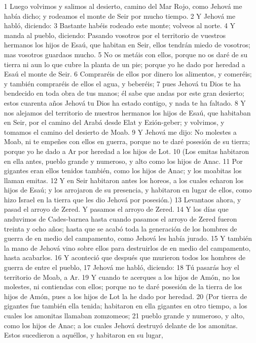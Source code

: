1 Luego volvimos y salimos al desierto, camino del Mar Rojo, como Jehová me había dicho; y rodeamos el monte de Seir por mucho tiempo.
2 Y Jehová me habló, diciendo:
3 Bastante habéis rodeado este monte; volveos al norte.
4 Y manda al pueblo, diciendo: Pasando vosotros por el territorio de vuestros hermanos los hijos de Esaú, que habitan en Seir, ellos tendrán miedo de vosotros; mas vosotros guardaos mucho.
5 No os metáis con ellos, porque no os daré de su tierra ni aun lo que cubre la planta de un pie; porque yo he dado por heredad a Esaú el monte de Seir.
6 Compraréis de ellos por dinero los alimentos, y comeréis; y también compraréis de ellos el agua, y beberéis;
7 pues Jehová tu Dios te ha bendecido en toda obra de tus manos; él sabe que andas por este gran desierto; estos cuarenta años Jehová tu Dios ha estado contigo, y nada te ha faltado.
8 Y nos alejamos del territorio de nuestros hermanos los hijos de Esaú, que habitaban en Seir, por el camino del Arabá desde Elat y Ezión-geber; y volvimos, y tomamos el camino del desierto de Moab.
9 Y Jehová me dijo: No molestes a Moab, ni te empeñes con ellos en guerra, porque no te daré posesión de su tierra; porque yo he dado a Ar por heredad a los hijos de Lot.
10 (Los emitas habitaron en ella antes, pueblo grande y numeroso, y alto como los hijos de Anac.
11 Por gigantes eran ellos tenidos también, como los hijos de Anac; y los moabitas los llaman emitas.
12 Y en Seir habitaron antes los horeos, a los cuales echaron los hijos de Esaú; y los arrojaron de su presencia, y habitaron en lugar de ellos, como hizo Israel en la tierra que les dio Jehová por posesión.)
13 Levantaos ahora, y pasad el arroyo de Zered. Y pasamos el arroyo de Zered.
14 Y los días que anduvimos de Cades-barnea hasta cuando pasamos el arroyo de Zered fueron treinta y ocho años; hasta que se acabó toda la generación de los hombres de guerra de en medio del campamento, como Jehová les había jurado. 
15 Y también la mano de Jehová vino sobre ellos para destruirlos de en medio del campamento, hasta acabarlos.
16 Y aconteció que después que murieron todos los hombres de guerra de entre el pueblo,
17 Jehová me habló, diciendo:
18 Tú pasarás hoy el territorio de Moab, a Ar.
19 Y cuando te acerques a los hijos de Amón, no los molestes, ni contiendas con ellos; porque no te daré posesión de la tierra de los hijos de Amón, pues a los hijos de Lot la he dado por heredad.
20 (Por tierra de gigantes fue también ella tenida; habitaron en ella gigantes en otro tiempo, a los cuales los amonitas llamaban zomzomeos;
21 pueblo grande y numeroso, y alto, como los hijos de Anac; a los cuales Jehová destruyó delante de los amonitas. Estos sucedieron a aquéllos, y habitaron en su lugar,
